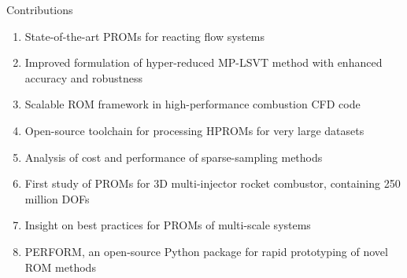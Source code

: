\documentclass[]{beamer}
\begin{document}

\begin{frame}{Contributions}
    \begin{enumerate}
        \item State-of-the-art PROMs for reacting flow systems
        \item Improved formulation of hyper-reduced MP-LSVT method with enhanced accuracy and robustness
        \item Scalable ROM framework in high-performance combustion CFD code
        \item Open-source toolchain for processing HPROMs for very large datasets
        \item Analysis of cost and performance of sparse-sampling methods
        \item First study of PROMs for 3D multi-injector rocket combustor, containing 250 million DOFs
        \item Insight on best practices for PROMs of multi-scale systems
        \item PERFORM, an open-source Python package for rapid prototyping of novel ROM methods
    \end{enumerate}
\end{frame}
\end{document}
